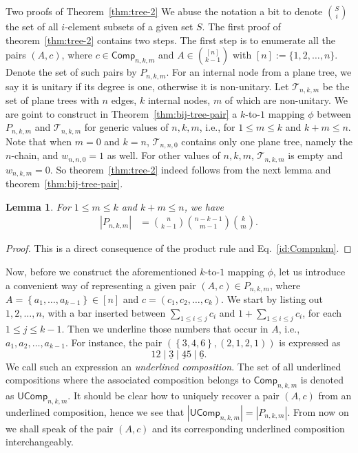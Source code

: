 \documentclass[reqno]{amsart}
\makeatletter
\numberwithin{equation}{section}
\newtheorem{lemma}[theorem]{Lemma}
\theoremstyle{definition}
\theoremstyle{named}
\newcommand{\abs}[1]{\left|#1\right|}
\newcommand{\set}[1]{\left\{#1\right\}}
\def\section{\@startsection{section}{1}%
  \z@{.7\linespacing\@plus\linespacing}{.5\linespacing}%
  {\normalfont\scshape}}%
\newcommand{\cT}{\mathcal{T}}
\def\Comp{\mathsf{Comp}}
\def\UComp{\mathsf{UComp}}
\makeatother
\begin{document}
\section{Two proofs of Theorem~\ref{thm:tree-2}}\label{sec:pf of tree-2}
We abuse the notation a bit to denote $\binom{S}{i}$ the set of all $i$-element subsets of a given set $S$. The first proof of theorem~\ref{thm:tree-2} contains two steps. The first step is to enumerate all the pairs $(A,c)$, where $c\in\Comp_{n,k,m}$ and $A\in\binom{[n]}{k-1}$ with $[n]:=\{1,2,\ldots,n\}$. Denote the set of such pairs by $P_{n,k,m}$. For an internal node from a plane tree, we say it is unitary if its degree is one, otherwise it is non-unitary. Let $\cT_{n,k,m}$ be the set of plane trees with $n$ edges, $k$ internal nodes, $m$ of which are non-unitary. We are goint to construct in Theorem~\ref{thm:bij-tree-pair} a $k$-to-$1$ mapping $\phi$ between $P_{n,k,m}$ and $\cT_{n,k,m}$ for generic values of $n,k,m$, i.e., for $1\le m\le k$ and $k+m\le n$. Note that when $m=0$ and $k=n$, $\cT_{n,n,0}$ contains only one plane tree, namely the $n$-chain, and $w_{n,n,0}=1$ as well. For other values of $n,k,m$, $\cT_{n,k,m}$ is empty and $w_{n,k,m}=0$. So theorem~\ref{thm:tree-2} indeed follows from the next lemma and theorem~\ref{thm:bij-tree-pair}.
\begin{lemma}\label{lem:pair enum}
For $1 \leq m \leq k$ and $k+m\le n$, we have
\begin{align}\label{pt-p}
\abs{P_{n,k,m}} &= \binom{n}{k-1} \binom{n-k-1}{m-1}\binom{k}{m}.
\end{align}
\end{lemma}
\begin{proof}
This is a direct consequence of the product rule and Eq.~\eqref{id:Compnkm}.
\end{proof}

Now, before we construct the aforementioned $k$-to-$1$ mapping $\phi$, let us introduce a convenient way of representing a given pair $(A,c)\in P_{n,k,m}$, where $A=\set{a_1,\ldots,a_{k-1}}\in[n]$ and $c=(c_1,c_2,\ldots,c_k)$. We start by listing out $1,2,\ldots,n$, with a bar inserted between $\sum_{1\le i\le j}c_i$ and $1+\sum_{1\le i\le j}c_i$, for each $1\le j\le k-1$. Then we underline those numbers that occur in $A$, i.e., $a_1,a_2,\ldots,a_{k-1}$. For instance, the pair $(\set{3,4,6},(2,1,2,1))$ is expressed as 
$$12\mid \underline{3}\mid \underline{4} 5\mid \underline{6}.$$
We call such an expression an {\it underlined composition}. The set of all underlined compositions where the associated composition belongs to $\Comp_{n,k,m}$ is denoted as $\UComp_{n,k,m}$. It should be clear how to uniquely recover a pair $(A,c)$ from an underlined composition, hence we see that $\abs{\UComp_{n,k,m}}=\abs{P_{n,k,m}}$. From now on we shall speak of the pair $(A,c)$ and its corresponding underlined composition interchangeably.
\end{document}
